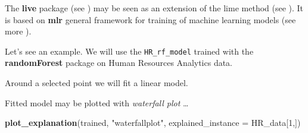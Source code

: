 \documentclass[]{book}
\newenvironment{Shaded}{\begin{snugshade}}{\end{snugshade}}
\newcommand{\KeywordTok}[1]{\textcolor[rgb]{0.13,0.29,0.53}{\textbf{#1}}}
\newcommand{\DataTypeTok}[1]{\textcolor[rgb]{0.13,0.29,0.53}{#1}}
\newcommand{\DecValTok}[1]{\textcolor[rgb]{0.00,0.00,0.81}{#1}}
\newcommand{\StringTok}[1]{\textcolor[rgb]{0.31,0.60,0.02}{#1}}
\newcommand{\OtherTok}[1]{\textcolor[rgb]{0.56,0.35,0.01}{#1}}
\newcommand{\OperatorTok}[1]{\textcolor[rgb]{0.81,0.36,0.00}{\textbf{#1}}}
\newcommand{\NormalTok}[1]{#1}
\theoremstyle{definition}
\theoremstyle{definition}
\theoremstyle{definition}
\theoremstyle{remark}
\begin{document}
The \textbf{live} package (see \citep{live}) may be seen as an extension
of the lime method (see \citep{lime}). It is based on \textbf{mlr}
general framework for training of machine learning models (see more
\citep{mlr}).

Let's see an example. We will use the \texttt{HR\_rf\_model} trained
with the \textbf{randomForest} package on Human Resources Analytics
data.

Around a selected point we will fit a linear model.

\begin{Shaded}
\end{Shaded}

Fitted model may be plotted with \emph{waterfall plot} \ldots{}

\begin{Shaded}
\begin{Highlighting}[]
\KeywordTok{plot_explanation}\NormalTok{(trained, }\StringTok{"waterfallplot"}\NormalTok{, }\DataTypeTok{explained_instance =}\NormalTok{ HR_data[}\DecValTok{1}\NormalTok{,])}
\end{Highlighting}
\end{Shaded}
\end{document}
